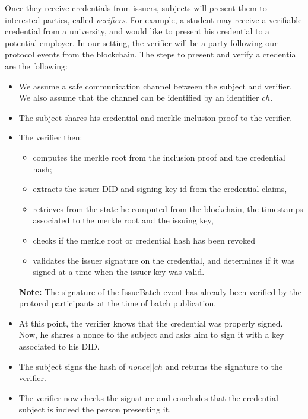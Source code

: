 \documentclass[10pt,a4paper]{article}
\begin{document}
Once they receive credentials from issuers, subjects will present them to interested parties, called \emph{verifiers}. For example, a student may receive a verifiable credential from a university, and would like to present his credential to a potential employer. In our setting, the verifier will be a party following our protocol events from the blockchain. The steps to present and verify a credential are the following:
\begin{itemize}
\item We assume a safe communication channel between the subject and verifier.
      We also assume that the channel can be identified by an identifier $ch$.
\item The subject shares his credential and merkle inclusion proof to the verifier.
\item The verifier then: 
	\begin{itemize}
	\item computes the merkle root from the inclusion proof and the credential hash;
	\item extracts the issuer DID and signing key id from the credential claims,
	\item retrieves from the state he computed from the blockchain, the timestamps associated to the merkle root and the issuing key, 
	\item checks if the merkle root or credential hash has been revoked
	\item validates the issuer signature on the credential, and determines if it was signed at a time when the issuer key was valid.
	\end{itemize}
  \textbf{Note:} The signature of the IssueBatch event has already been verified by the protocol participants at the time of batch publication. 
\item At this point, the verifier knows that the credential was properly signed. Now, he shares a nonce to the subject and asks him to sign it with a key associated to his DID.
\item The subject signs the hash of $nonce || ch$ and returns the signature to the verifier.
\item The verifier now checks the signature and concludes that the credential subject is indeed the person presenting it.
\end{itemize}

\end{document}
